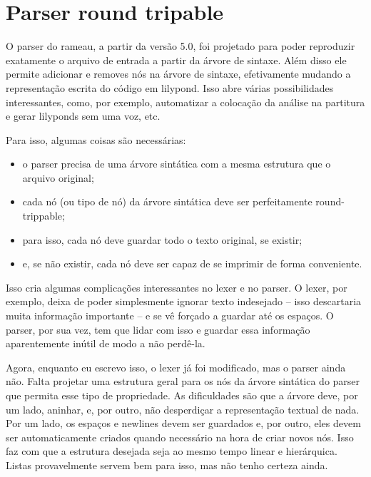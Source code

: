 \documentclass[12pt,brazil]{book}
\begin{document}
\chapter{Parser round tripable}
\label{chap:parser-novo}

O parser do rameau, a partir da versão 5.0, foi projetado para poder
reproduzir exatamente o arquivo de entrada a partir da árvore de
sintaxe. Além disso ele permite adicionar e removes nós na árvore de
sintaxe, efetivamente mudando a representação escrita do código em
lilypond. Isso abre várias possibilidades interessantes, como, por
exemplo, automatizar a colocação da análise na partitura e gerar
lilyponds sem uma voz, etc.

Para isso, algumas coisas são necessárias:
\begin{itemize}
\item o parser precisa de uma árvore sintática com a mesma estrutura
  que o arquivo original;
\item cada nó (ou tipo de nó) da árvore sintática deve ser
  perfeitamente round-trippable;
\item para isso, cada nó deve guardar todo o texto original, se existir;
\item e, se não existir, cada nó deve ser capaz de se imprimir de
  forma conveniente.
\end{itemize}

Isso cria algumas complicações interessantes no lexer e no parser. O
lexer, por exemplo, deixa de poder simplesmente ignorar texto
indesejado -- isso descartaria muita informação importante -- e se vê
forçado a guardar até os espaços. O parser, por sua vez, tem que lidar
com isso e guardar essa informação aparentemente inútil de modo a não
perdê-la.

Agora, enquanto eu escrevo isso, o lexer já foi modificado, mas o
parser ainda não. Falta projetar uma estrutura geral para os nós da
árvore sintática do parser que permita esse tipo de propriedade. As
dificuldades são que a árvore deve, por um lado, aninhar, e, por
outro, não desperdiçar a representação textual de nada. Por um lado,
os espaços e newlines devem ser guardados e, por outro, eles devem ser
automaticamente criados quando necessário na hora de criar novos
nós. Isso faz com que a estrutura desejada seja ao mesmo tempo linear
e hierárquica. Listas provavelmente servem bem para isso, mas não
tenho certeza ainda.
\end{document}
